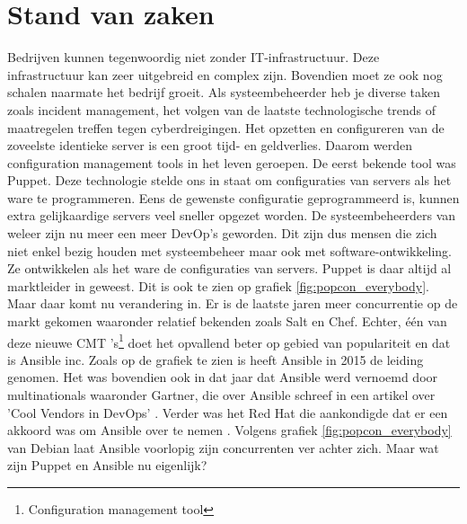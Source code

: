 \section{Stand van zaken}
\label{sec:stand-van-zaken}
Bedrijven kunnen tegenwoordig niet zonder IT-infrastructuur. Deze infrastructuur kan zeer uitgebreid en complex zijn. Bovendien moet ze ook nog schalen naarmate het bedrijf groeit. Als systeembeheerder heb je diverse taken zoals incident management, 
het volgen van de laatste technologische trends of maatregelen treffen tegen cyberdreigingen. Het opzetten en configureren van de zoveelste identieke server is een groot tijd- en geldverlies. Daarom werden configuration management tools in het leven geroepen. De eerst bekende tool was Puppet. Deze technologie stelde ons in staat om configuraties van servers als het ware te programmeren. Eens de gewenste configuratie geprogrammeerd is, kunnen extra gelijkaardige servers veel sneller opgezet worden. De systeembeheerders van weleer zijn nu meer een meer DevOp's geworden. Dit zijn dus mensen die zich niet enkel bezig houden met systeembeheer maar ook met software-ontwikkeling. Ze ontwikkelen als het ware de configuraties van servers. Puppet is daar altijd al marktleider in geweest. Dit is ook te zien op grafiek \ref{fig:popcon_everybody}. Maar daar komt nu verandering in. Er is de laatste jaren meer concurrentie op de markt gekomen waaronder relatief bekenden zoals Salt en Chef. 
Echter,  \'e\'en van deze nieuwe CMT 's\footnote{Configuration management tool} doet het opvallend beter op gebied van populariteit en dat is Ansible inc. Zoals op de grafiek te zien is heeft Ansible in 2015 de leiding genomen. Het was bovendien ook in dat jaar dat Ansible werd vernoemd door multinationals waaronder Gartner, die over Ansible schreef in een artikel over  'Cool Vendors in DevOps' \autocite{coolvendors}. Verder was het Red Hat die aankondigde dat er een akkoord was om Ansible over te nemen \autocite{redhatovername}. Volgens grafiek  \ref{fig:popcon_everybody} van Debian laat Ansible voorlopig zijn concurrenten ver achter zich. Maar wat zijn Puppet en Ansible nu eigenlijk?

